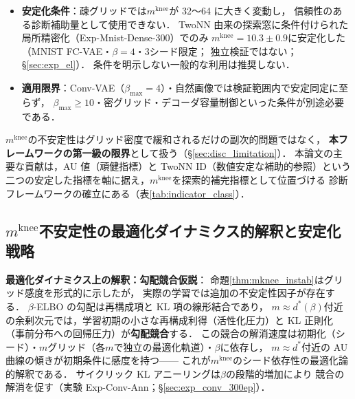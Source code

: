 \documentclass[11pt,a4paper]{jsarticle}
\newcommand{\mknee}{m^{\mathrm{knee}}}
\begin{document}
\begin{itemize}
  \item \textbf{安定化条件}：疎グリッドでは$\mknee$が 32〜64 に大きく変動し，
        信頼性のある診断補助量として使用できない．
        TwoNN 由来の探索窓に条件付けられた局所精密化（Exp-Mnist-Dense-300）でのみ
        $\mknee = 10.3 \pm 0.9$に安定化した（MNIST FC-VAE・$\beta = 4$・3シード限定；
        独立検証ではない；§\ref{sec:exp_el}）．
        条件を明示しない一般的な利用は推奨しない．
  \item \textbf{適用限界}：Conv-VAE（$\beta_{\max}=4$）・自然画像では検証範囲内で安定同定に至らず，
        $\beta_{\max} \geq 10$・密グリッド・デコーダ容量制御といった条件が別途必要である．
\end{itemize}

$\mknee$の不安定性はグリッド密度で緩和されるだけの副次的問題ではなく，
\textbf{本フレームワークの第一級の限界}として扱う（§\ref{sec:disc_limitation}）．
本論文の主要な貢献は，AU 値（頑健指標）と TwoNN ID（数値安定な補助的参照）という
二つの安定した指標を軸に据え，$\mknee$を探索的補完指標として位置づける
診断フレームワークの確立にある（表\ref{tab:indicator_class}）．

\subsection{$\mknee$不安定性の最適化ダイナミクス的解釈と安定化戦略}\label{sec:disc_mknee_improve}

\textbf{最適化ダイナミクス上の解釈：勾配競合仮説}：
命題\ref{thm:mknee_instab}はグリッド感度を形式的に示したが，
実際の学習では追加の不安定性因子が存在する．
$\beta$-ELBO の勾配は再構成項と KL 項の線形結合であり，
$m \approx d^*(\beta)$付近の余剰次元では，学習初期の小さな再構成利得（活性化圧力）と
KL 正則化（事前分布への回帰圧力）が\textbf{勾配競合}する．
この競合の解消速度は初期化（シード）・$m$グリッド（各$m$で独立の最適化軌道）・$\beta$に依存し，
$m \approx d^*$付近の AU 曲線の傾きが初期条件に感度を持つ——
これが$\mknee$のシード依存性の最適化論的解釈である．
サイクリック KL アニーリング\cite{fu2019cyclical}は$\beta$の段階的増加により
競合の解消を促す（実験 Exp-Conv-Ann；§\ref{sec:exp_conv_300ep}）．
\end{document}
